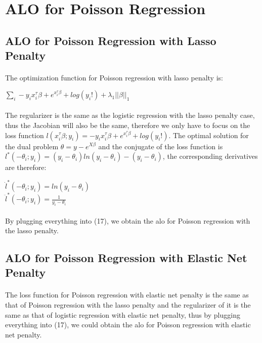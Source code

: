 \documentclass{article}
\begin{document}
\section{ALO for Poisson Regression}
\subsection{ALO for Poisson Regression with Lasso Penalty}
\paragraph{}The optimization function for Poisson regression with lasso penalty is:
\begin{center}
$\sum\limits_{i}-y_{i}x_{i}^{\tau}\beta+e^{x_{i}^{\tau}\beta}+log(y_{i}!) + \lambda_{1}||\beta||_{1}$
\end{center}
\paragraph{}The regularizer is the same as the logistic regression with the lasso penalty case, thus the Jacobian will also be the same, therefore we only have to focus on the loss function $l(x_{i}^{\tau}\beta ; y_{i}) = -y_{i}x_{i}^{\tau}\beta+e^{x_{i}^{\tau}\beta}+log(y_{i}!)$. The optimal solution for the dual problem $\hat{\theta} = y - e^{X\beta}$ and the conjugate of the loss function is $l^{*}(-\theta_{i};y_{i}) = (y_{i}-\theta_{i})ln(y_{i}-\theta_{i})-(y_{i}-\theta_{i})$, the corresponding derivatives are therefore:
\begin{center}
$\dot{l}^{*}(-\theta_{i};y_{i}) = ln(y_{i}-\theta_{i})$\\
$\ddot{l}^{*}(-\theta_{i};y_{i}) = \frac{1}{y_{i}-\theta_{i}}$
\end{center}
\paragraph{}By plugging everything into (17), we obtain the alo for Poisson regression with the lasso penalty.
\subsection{ALO for Poisson Regression with Elastic Net Penalty}
\paragraph{}The loss function for Poisson regression with elastic net penalty is the same as that of Poisson regression with the lasso penalty and the regularizer of it is the same as that of logistic regression with elastic net penalty, thus by plugging everything into (17), we could obtain the alo for Poisson regression with elastic net penalty.
\end{document}
